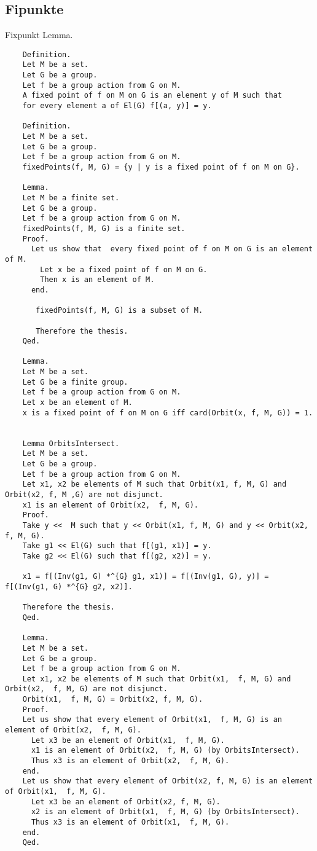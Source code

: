 \documentclass[a4paper,12pt]{scrartcl}
\begin{document}
\subsection{Fipunkte}

Fixpunkt Lemma.

\begin{lstlisting}
	Definition.
	Let M be a set.
	Let G be a group.
	Let f be a group action from G on M.
	A fixed point of f on M on G is an element y of M such that
	for every element a of El(G) f[(a, y)] = y.
	
	Definition.
	Let M be a set.
	Let G be a group.
	Let f be a group action from G on M.
	fixedPoints(f, M, G) = {y | y is a fixed point of f on M on G}.
	
	Lemma.
	Let M be a finite set.
	Let G be a group.
	Let f be a group action from G on M.
	fixedPoints(f, M, G) is a finite set.
	Proof.
	  Let us show that  every fixed point of f on M on G is an element of M.
		Let x be a fixed point of f on M on G.
		Then x is an element of M.
	  end.
	
	   fixedPoints(f, M, G) is a subset of M.
	
	   Therefore the thesis.
	Qed.
	
	Lemma.
	Let M be a set.
	Let G be a finite group.
	Let f be a group action from G on M.
	Let x be an element of M.
	x is a fixed point of f on M on G iff card(Orbit(x, f, M, G)) = 1.
	
	
	Lemma OrbitsIntersect.
	Let M be a set.
	Let G be a group.
	Let f be a group action from G on M.
	Let x1, x2 be elements of M such that Orbit(x1, f, M, G) and Orbit(x2, f, M ,G) are not disjunct.
	x1 is an element of Orbit(x2,  f, M, G).
	Proof.
	Take y <<  M such that y << Orbit(x1, f, M, G) and y << Orbit(x2, f, M, G).
	Take g1 << El(G) such that f[(g1, x1)] = y.
	Take g2 << El(G) such that f[(g2, x2)] = y.
	
	x1 = f[(Inv(g1, G) *^{G} g1, x1)] = f[(Inv(g1, G), y)] = f[(Inv(g1, G) *^{G} g2, x2)].
	
	Therefore the thesis.
	Qed.
	
	Lemma.
	Let M be a set.
	Let G be a group.
	Let f be a group action from G on M.
	Let x1, x2 be elements of M such that Orbit(x1,  f, M, G) and Orbit(x2,  f, M, G) are not disjunct.
	Orbit(x1,  f, M, G) = Orbit(x2, f, M, G).
	Proof.
	Let us show that every element of Orbit(x1,  f, M, G) is an element of Orbit(x2,  f, M, G).
	  Let x3 be an element of Orbit(x1,  f, M, G).
	  x1 is an element of Orbit(x2,  f, M, G) (by OrbitsIntersect).
	  Thus x3 is an element of Orbit(x2,  f, M, G).
	end.
	Let us show that every element of Orbit(x2, f, M, G) is an element of Orbit(x1,  f, M, G).
	  Let x3 be an element of Orbit(x2, f, M, G).
	  x2 is an element of Orbit(x1,  f, M, G) (by OrbitsIntersect).
	  Thus x3 is an element of Orbit(x1,  f, M, G).
	end.
	Qed.
	

\end{lstlisting}
\end{document}
